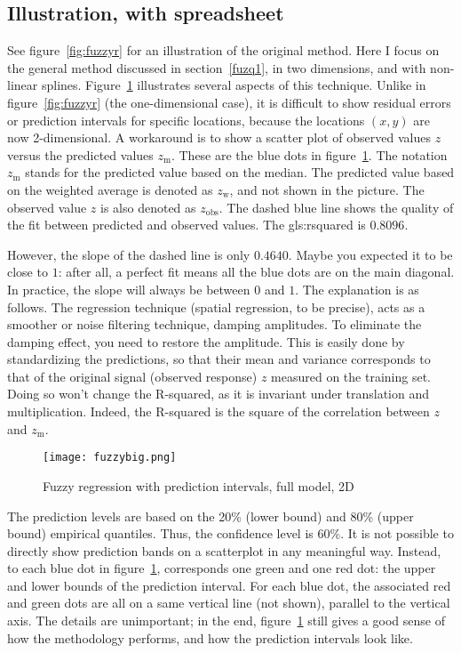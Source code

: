 \documentclass[oneside,10pt]{book}
\begin{document}
\subsection{Illustration, with spreadsheet}

See figure~\ref{fig:fuzzyr} for an illustration of the original method. Here I focus on the general method discussed in section~\ref{fuzq1}, in two dimensions, and with non-linear splines. Figure~\ref{fig:fuzzybig} illustrates several aspects of this technique. Unlike in figure~\ref{fig:fuzzyr} (the one-dimensional case), it is difficult to show residual errors or prediction intervals for specific locations, because the locations $(x,y)$ are now 2-dimensional. A workaround is to show a scatter plot of observed values $z$ versus the predicted values $z_{\text{m}}$. These are the blue dots in
figure~\ref{fig:fuzzybig}. The notation $z_{\text{m}}$ stands for the predicted value based on the median. The predicted value based on the weighted average is denoted as $z_{\text{w}}$, and not shown in the picture. The observed value $z$ is also denoted as $z_{\text{obs}}$. The dashed blue line shows the quality of the fit between predicted and observed values. The \gls{gls:rsquared} is $0.8096$.

However, the slope of the dashed line is only $0.4640$. Maybe you expected it to be close to $1$: after all, a perfect fit means all the blue dots are on the main diagonal. In practice, the slope will always be between $0$ and $1$. The explanation is as follows. The regression technique (spatial regression, to be precise), acts as a smoother or noise filtering technique, damping amplitudes. To eliminate the damping effect, you need to restore the amplitude. This is easily done by standardizing the predictions, so that their mean and variance corresponds to that of the original signal (observed response) $z$ measured on the training set. Doing so won't change the R-squared, as it is invariant under translation and multiplication. Indeed, the R-squared is the square of the correlation between $z$ and $z_{\text{m}}$.

\begin{figure}%
\centering
\texttt{[image: fuzzybig.png]}
\caption{Fuzzy regression with prediction intervals, full model, 2D}
\label{fig:fuzzybig}
\end{figure}

The prediction levels are based on the 20\% (lower bound) and 80\% (upper bound) empirical quantiles. Thus, the confidence level is 60\%. It is not possible to directly show prediction bands on a scatterplot in any meaningful way. Instead, to each blue dot in figure~\ref{fig:fuzzybig}, corresponds one green and one red dot: the upper and lower bounds of the prediction interval. For each blue dot, the associated red and green dots are all on a same vertical line (not shown), parallel to the vertical axis. The details are unimportant; in the end, figure~\ref{fig:fuzzybig} still gives a good sense of how the methodology performs, and how the prediction intervals look like.
\end{document}

